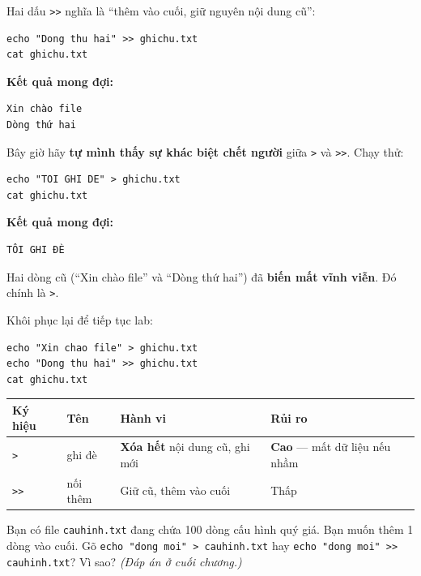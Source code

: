 \documentclass[12pt,a4paper]{article}
\newcommand{\cmd}[1]{\texttt{#1}}
\begin{document}
Hai dấu \cmd{>>} nghĩa là ``thêm vào cuối, giữ nguyên nội dung cũ'':

\begin{Verbatim}
echo "Dong thu hai" >> ghichu.txt
cat ghichu.txt
\end{Verbatim}

\textbf{Kết quả mong đợi:}
\begin{Verbatim}
Xin chào file
Dòng thứ hai
\end{Verbatim}

Bây giờ hãy \textbf{tự mình thấy sự khác biệt chết người} giữa \cmd{>} và \cmd{>>}. Chạy thử:

\begin{Verbatim}
echo "TOI GHI DE" > ghichu.txt
cat ghichu.txt
\end{Verbatim}

\textbf{Kết quả mong đợi:}
\begin{Verbatim}
TÔI GHI ĐÈ
\end{Verbatim}

Hai dòng cũ (``Xin chào file'' và ``Dòng thứ hai'') đã \textbf{biến mất vĩnh viễn}. Đó chính là \cmd{>}.

Khôi phục lại để tiếp tục lab:
\begin{Verbatim}
echo "Xin chao file" > ghichu.txt
echo "Dong thu hai" >> ghichu.txt
cat ghichu.txt
\end{Verbatim}

\begin{dangerbox}[title={Bảng so sánh \texttt{>} và \texttt{>>}}]
\renewcommand{\arraystretch}{1.3}
\begin{tabular}{>{\raggedright\arraybackslash}p{2cm} >{\raggedright\arraybackslash}p{2cm} >{\raggedright\arraybackslash}p{5cm} >{\raggedright\arraybackslash}p{3.5cm}}
\textbf{Ký hiệu} & \textbf{Tên} & \textbf{Hành vi} & \textbf{Rủi ro} \\
\hline
\cmd{>} & ghi đè & \textbf{Xóa hết} nội dung cũ, ghi mới & \textbf{Cao} --- mất dữ liệu nếu nhầm \\
\cmd{>>} & nối thêm & Giữ cũ, thêm vào cuối & Thấp \\
\end{tabular}
\end{dangerbox}

\begin{checkbox}[title={Tự kiểm tra 2}]
Bạn có file \cmd{cauhinh.txt} đang chứa 100 dòng cấu hình quý giá. Bạn muốn thêm 1 dòng vào cuối. Gõ \cmd{echo "dong moi" > cauhinh.txt} hay \cmd{echo "dong moi" >> cauhinh.txt}? Vì sao? \textit{(Đáp án ở cuối chương.)}
\end{checkbox}
\end{document}
